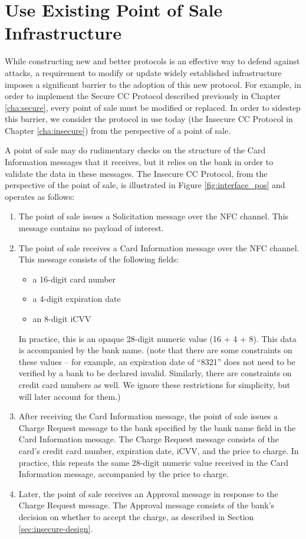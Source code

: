 \section{Use Existing Point of Sale Infrastructure}
\label{sec:goals-infrastructure}

While constructing new and better protocols is an effective way to defend against attacks,
	a requirement to modify or update widely established infrastructure imposes a significant barrier to the adoption of this new protocol.
For example, in order to implement the Secure CC Protocol described previously in Chapter \ref{cha:secure}, every point of sale must be modified or replaced.
In order to sidestep this barrier, we consider the protocol in use today (the Insecure CC Protocol in Chapter \ref{cha:insecure}) from the perspective of a point of sale.

A point of sale may do rudimentary checks on the structure of the Card Information messages that it receives,
	but it relies on the bank in order to validate the data in these messages.
The Insecure CC Protocol, from the perspective of the point of sale, is illustrated in Figure \ref{fig:interface_pos} and operates as follows:

\begin{enumerate}
\item The point of sale issues a Solicitation message over the NFC channel.
	This message contains no payload of interest.
\item The point of sale receives a Card Information message over the NFC channel.
	This message consists of the following fields:
	\begin{itemize}
	\item a 16-digit card number
	\item a 4-digit expiration date
	\item an 8-digit iCVV
	\end{itemize}
	In practice, this is an opaque 28-digit numeric value (16 + 4 + 8).
	This data is accompanied by the bank name.
	(note that there are some constraints on these values -- for example, an expiration date of ``8321'' does not need to be verified by a bank to be declared invalid.
	Similarly, there are constraints on credit card numbers as well.
	We ignore these restrictions for simplicity, but will later account for them.)
\item After receiving the Card Information message,
	the point of sale issues a Charge Request message to the bank specified by the bank name field in the Card Information message.
	The Charge Request message consists of the card's credit card number, expiration date, iCVV, and the price to charge.
	In practice, this repeats the same 28-digit numeric value received in the Card Information message, accompanied by the price to charge.
\item Later, the point of sale receives an Approval message in response to the Charge Request message.
	The Approval message consists of the bank's decision on whether to accept the charge, as described in Section \ref{sec:insecure-design}.
\end{enumerate}

